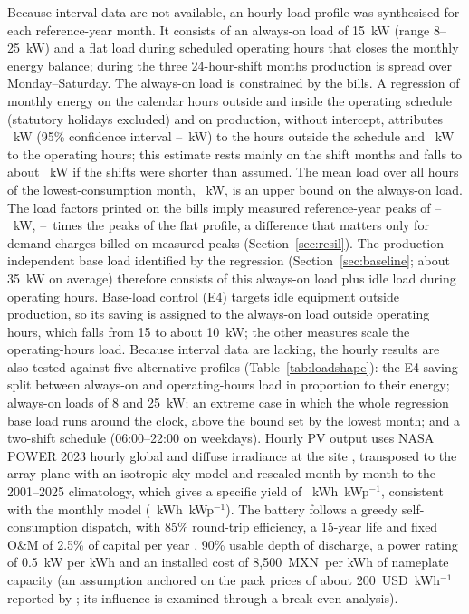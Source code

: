 \documentclass[preprint,12pt,authoryear]{elsarticle}
\newcommand{\MXN}{MXN}
\begin{document}
Because interval data are not available, an hourly load profile was synthesised for each reference-year month. It consists of an always-on load of 15~kW (range 8--25~kW) and a flat load during scheduled operating hours that closes the monthly energy balance; during the three 24-hour-shift months production is spread over Monday--Saturday. The always-on load is constrained by the bills. A regression of monthly energy on the calendar hours outside and inside the operating schedule (statutory holidays excluded) and on production, without intercept, attributes \nBCAon~kW (95\% confidence interval \nBCAonLo--\nBCAonHi~kW) to the hours outside the schedule and \nBCOp~kW to the operating hours; this estimate rests mainly on the shift months and falls to about \nBCAonShort~kW if the shifts were shorter than assumed. The mean load over all hours of the lowest-consumption month, \nBCLowMonth~kW, is an upper bound on the always-on load. The load factors printed on the bills imply measured reference-year peaks of \nBCPeakLo--\nBCPeakHi~kW, \nBCRatioLo--\nBCRatioHi\ times the peaks of the flat profile, a difference that matters only for demand charges billed on measured peaks (Section~\ref{sec:resil}). The production-independent base load identified by the regression (Section~\ref{sec:baseline}; about 35~kW on average) therefore consists of this always-on load plus idle load during operating hours. Base-load control (E4) targets idle equipment outside production, so its saving is assigned to the always-on load outside operating hours, which falls from 15 to about 10~kW; the other measures scale the operating-hours load. Because interval data are lacking, the hourly results are also tested against five alternative profiles (Table~\ref{tab:loadshape}): the E4 saving split between always-on and operating-hours load in proportion to their energy; always-on loads of 8 and 25~kW; an extreme case in which the whole regression base load runs around the clock, above the bound set by the lowest month; and a two-shift schedule (06:00--22:00 on weekdays). Hourly PV output uses NASA POWER 2023 hourly global and diffuse irradiance at the site \citep{nasapower}, transposed to the array plane with an isotropic-sky model and rescaled month by month to the 2001--2025 climatology, which gives a specific yield of \nSpecYieldHourly~kWh~kWp$^{-1}$, consistent with the monthly model (\nSpecYield~kWh~kWp$^{-1}$). The battery follows a greedy self-consumption dispatch, with 85\% round-trip efficiency, a 15-year life and fixed O\&M of 2.5\% of capital per year \citep{nrel2024atb}, 90\% usable depth of discharge, a power rating of 0.5~kW per kWh and an installed cost of 8,500~\MXN\ per kWh of nameplate capacity (an assumption anchored on the pack prices of about 200~USD~kWh$^{-1}$ reported by \citealp{nrel2024atb}; its influence is examined through a break-even analysis).
\end{document}
